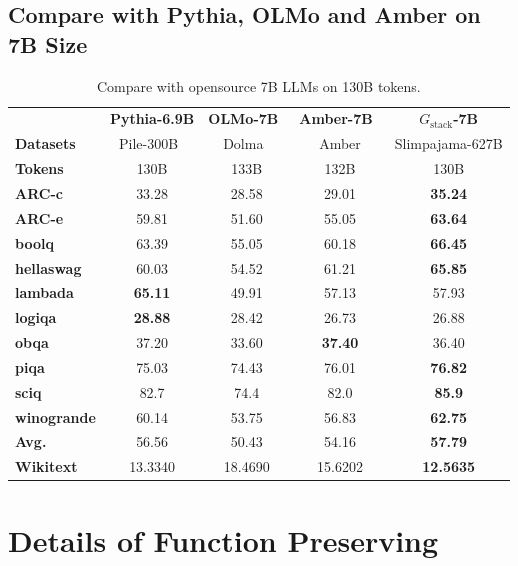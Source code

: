 \documentclass{article}
\begin{document}
\subsection{Compare with Pythia, OLMo and Amber on 7B Size}

\begin{table}[H]
\caption{Compare with opensource 7B LLMs on 130B tokens.}\label{tab:compare_7B}\vspace{2mm}
    \centering
    \small
    \begin{tabular}{lccc|c}
        \hline
        \toprule
         & \textbf{Pythia-6.9B} & \textbf{OLMo-7B}~\cite{Groeneveld2023OLMo} & \textbf{Amber-7B~\cite{liu2023llm360}} & \textbf{$G_{\text{stack}}$-7B}\\
        \textbf{Datasets} & Pile-300B~\cite{gao2020pile} & Dolma~\cite{dolma} & Amber & Slimpajama-627B\\
        \textbf{Tokens} & 130B & 133B & 132B & 130B\\
        \hline
        \textbf{ARC-c} & 33.28 & 28.58 & 29.01 & \textbf{35.24} \\
        \textbf{ARC-e} & 59.81 & 51.60 & 55.05 & \textbf{63.64} \\
        \textbf{boolq} & 63.39 & 55.05 & 60.18 & \textbf{66.45} \\
        \textbf{hellaswag} & 60.03 & 54.52 & 61.21 & \textbf{65.85} \\
        \textbf{lambada} & \textbf{65.11} & 49.91 & 57.13 & 57.93 \\
        \textbf{logiqa} & \textbf{28.88} & 28.42 & 26.73 & 26.88 \\
        \textbf{obqa} & 37.20 & 33.60 & \textbf{37.40} & 36.40 \\
        \textbf{piqa} & 75.03 & 74.43 & 76.01 & \textbf{76.82} \\
        \textbf{sciq} & 82.7 & 74.4 & 82.0 & \textbf{85.9} \\
        \textbf{winogrande} & 60.14 & 53.75 & 56.83 & \textbf{62.75} \\
        \hline
        \textbf{Avg.} & 56.56 & 50.43 & 54.16 & \textbf{57.79}\\
        \textbf{Wikitext} & 13.3340 & 18.4690 & 15.6202 & \textbf{12.5635} \\
        \hline
        \bottomrule
    \end{tabular}
\end{table}

\section{Details of Function Preserving}
\end{document}
